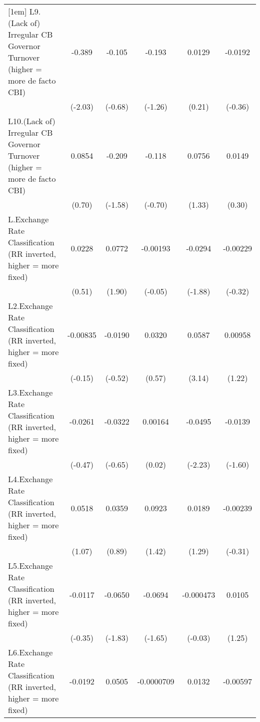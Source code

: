 {\begin{longtable}{l*{5}{c}}
[1em]
L9.(Lack of) Irregular CB Governor Turnover (higher = more de facto CBI)&   -0.389\sym{*}  &   -0.105         &   -0.193         &   0.0129         &  -0.0192         \\
                &  (-2.03)         &  (-0.68)         &  (-1.26)         &   (0.21)         &  (-0.36)         \\
[1em]
L10.(Lack of) Irregular CB Governor Turnover (higher = more de facto CBI)&   0.0854         &   -0.209         &   -0.118         &   0.0756         &   0.0149         \\
                &   (0.70)         &  (-1.58)         &  (-0.70)         &   (1.33)         &   (0.30)         \\
[1em]
L.Exchange Rate Classification (RR inverted, higher = more fixed)&   0.0228         &   0.0772         & -0.00193         &  -0.0294         & -0.00229         \\
                &   (0.51)         &   (1.90)         &  (-0.05)         &  (-1.88)         &  (-0.32)         \\
[1em]
L2.Exchange Rate Classification (RR inverted, higher = more fixed)& -0.00835         &  -0.0190         &   0.0320         &   0.0587\sym{**} &  0.00958         \\
                &  (-0.15)         &  (-0.52)         &   (0.57)         &   (3.14)         &   (1.22)         \\
[1em]
L3.Exchange Rate Classification (RR inverted, higher = more fixed)&  -0.0261         &  -0.0322         &  0.00164         &  -0.0495\sym{*}  &  -0.0139         \\
                &  (-0.47)         &  (-0.65)         &   (0.02)         &  (-2.23)         &  (-1.60)         \\
[1em]
L4.Exchange Rate Classification (RR inverted, higher = more fixed)&   0.0518         &   0.0359         &   0.0923         &   0.0189         & -0.00239         \\
                &   (1.07)         &   (0.89)         &   (1.42)         &   (1.29)         &  (-0.31)         \\
[1em]
L5.Exchange Rate Classification (RR inverted, higher = more fixed)&  -0.0117         &  -0.0650         &  -0.0694         &-0.000473         &   0.0105         \\
                &  (-0.35)         &  (-1.83)         &  (-1.65)         &  (-0.03)         &   (1.25)         \\
[1em]
L6.Exchange Rate Classification (RR inverted, higher = more fixed)&  -0.0192         &   0.0505         &-0.0000709         &   0.0132         & -0.00597         \\

\end{longtable}}
